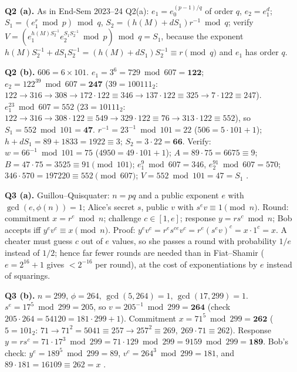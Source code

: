 \textbf{Q2 (a).} As in End-Sem 2023--24 Q2(a): $e_1 = e_0^{(p-1)/q}$ of order $q$, $e_2 = e_1^d$; $S_1 = (e_1^r \bmod p) \bmod q$, $S_2 = (h(M) + dS_1) r^{-1} \bmod q$; verify $V = (e_1^{h(M)S_2^{-1}} e_2^{S_1 S_2^{-1}} \bmod p) \bmod q = S_1$, because the exponent $h(M)S_2^{-1} + dS_1S_2^{-1} = (h(M) + dS_1)S_2^{-1} \equiv r \pmod q$ and $e_1$ has order $q$.

\textbf{Q2 (b).} $606 = 6 \times 101$. $e_1 = 3^6 = 729 \bmod 607 = \mathbf{122}$; $e_2 = 122^{39} \bmod 607 = \mathbf{247}$ ($39 = 100111_2$: $122 \to 316 \to 308 \to 172 \cdot 122 \equiv 346 \to 137 \cdot 122 \equiv 325 \to 7 \cdot 122 \equiv 247$).
$e_1^{23} \bmod 607 = 552$ ($23 = 10111_2$: $122 \to 316 \to 308 \cdot 122 \equiv 549 \to 329 \cdot 122 \equiv 76 \to 313 \cdot 122 \equiv 552$), so $S_1 = 552 \bmod 101 = \mathbf{47}$.
$r^{-1} = 23^{-1} \bmod 101 = 22$ ($506 = 5 \cdot 101 + 1$); $h + dS_1 = 89 + 1833 = 1922 \equiv 3$; $S_2 = 3 \cdot 22 = \mathbf{66}$.
Verify: $w = 66^{-1} \bmod 101 = 75$ ($4950 = 49 \cdot 101 + 1$); $A = 89 \cdot 75 = 6675 \equiv 9$; $B = 47 \cdot 75 = 3525 \equiv 91 \pmod{101}$; $e_1^9 \bmod 607 = 346$, $e_2^{91} \bmod 607 = 570$; $346 \cdot 570 = 197220 \equiv 552 \pmod{607}$; $V = 552 \bmod 101 = 47 = S_1$ \checkmark.

\textbf{Q3 (a).} Guillou--Quisquater: $n = pq$ and a public exponent $e$ with $\gcd(e, \phi(n)) = 1$; Alice's secret $s$, public $v$ with $s^e v \equiv 1 \pmod n$. Round: commitment $x = r^e \bmod n$; challenge $c \in [1, e]$; response $y = r s^c \bmod n$; Bob accepts iff $y^e v^c \equiv x \pmod n$. Proof: $y^e v^c = r^e s^{ce} v^c = r^e (s^e v)^c = x \cdot 1^c = x$. A cheater must guess $c$ out of $e$ values, so she passes a round with probability $1/e$ instead of $1/2$; hence far fewer rounds are needed than in Fiat--Shamir ($e = 2^{16}+1$ gives $< 2^{-16}$ per round), at the cost of exponentiations by $e$ instead of squarings.

\textbf{Q3 (b).} $n = 299$, $\phi = 264$, $\gcd(5, 264) = 1$, $\gcd(17, 299) = 1$. $s^e = 17^5 \bmod 299 = 205$, so $v = 205^{-1} \bmod 299 = \mathbf{264}$ (check $205 \cdot 264 = 54120 = 181 \cdot 299 + 1$).
Commitment $x = 71^5 \bmod 299 = \mathbf{262}$ ($5 = 101_2$: $71 \to 71^2 = 5041 \equiv 257 \to 257^2 \equiv 269,\ 269 \cdot 71 \equiv 262$).
Response $y = r s^c = 71 \cdot 17^3 \bmod 299 = 71 \cdot 129 \bmod 299 = 9159 \bmod 299 = \mathbf{189}$.
Bob's check: $y^e = 189^5 \bmod 299 = 89$, $v^c = 264^3 \bmod 299 = 181$, and $89 \cdot 181 = 16109 \equiv 262 = x$ \checkmark.

